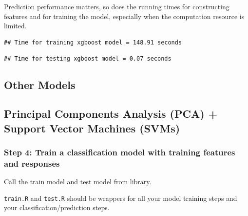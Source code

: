 \documentclass[
]{article}
\begin{document}
Prediction performance matters, so does the running times for
constructing features and for training the model, especially when the
computation resource is limited.

\begin{verbatim}
## Time for training xgboost model = 148.91 seconds
\end{verbatim}

\begin{verbatim}
## Time for testing xgboost model = 0.07 seconds
\end{verbatim}

\newpage

\hypertarget{other-models}{%
\subsection{Other Models}\label{other-models}}

\hypertarget{principal-components-analysis-pca-support-vector-machines-svms}{%
\subsection{Principal Components Analysis (PCA) + Support Vector
Machines
(SVMs)}\label{principal-components-analysis-pca-support-vector-machines-svms}}

\hypertarget{step-4-train-a-classification-model-with-training-features-and-responses-2}{%
\subsubsection{Step 4: Train a classification model with training
features and
responses}\label{step-4-train-a-classification-model-with-training-features-and-responses-2}}

Call the train model and test model from library.

\texttt{train.R} and \texttt{test.R} should be wrappers for all your
model training steps and your classification/prediction steps.
\end{document}
